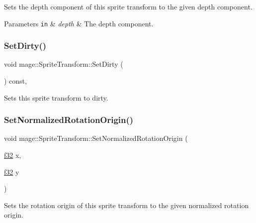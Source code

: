 Sets the depth component of this sprite transform to the given depth component.


\begin{DoxyParams}[1]{Parameters}
\mbox{\tt in}  & {\em depth} & The depth component. \\
\hline
\end{DoxyParams}
\hypertarget{structmage_1_1_sprite_transform_ab76e0ca7d8f4e37a8a6f58a7a9face17}{}\label{structmage_1_1_sprite_transform_ab76e0ca7d8f4e37a8a6f58a7a9face17} 
\subsubsection{\texorpdfstring{Set\+Dirty()}{SetDirty()}}
{\footnotesize\ttfamily void mage\+::\+Sprite\+Transform\+::\+Set\+Dirty (\begin{DoxyParamCaption}{ }\end{DoxyParamCaption}) const\hspace{0.3cm}{\ttfamily [private]}, {\ttfamily [noexcept]}}

Sets this sprite transform to dirty. \hypertarget{structmage_1_1_sprite_transform_ac4253aec133bc15e8ba9fd01c846413e}{}\label{structmage_1_1_sprite_transform_ac4253aec133bc15e8ba9fd01c846413e} 
\subsubsection{\texorpdfstring{Set\+Normalized\+Rotation\+Origin()}{SetNormalizedRotationOrigin()}\hspace{0.1cm}{\footnotesize\ttfamily [1/3]}}
{\footnotesize\ttfamily void mage\+::\+Sprite\+Transform\+::\+Set\+Normalized\+Rotation\+Origin (\begin{DoxyParamCaption}\item[{\hyperlink{namespacemage_a6a44ad388483959dc4dff9f2aef91431}{f32}}]{x,  }\item[{\hyperlink{namespacemage_a6a44ad388483959dc4dff9f2aef91431}{f32}}]{y }\end{DoxyParamCaption})}

Sets the rotation origin of this sprite transform to the given normalized rotation origin.

